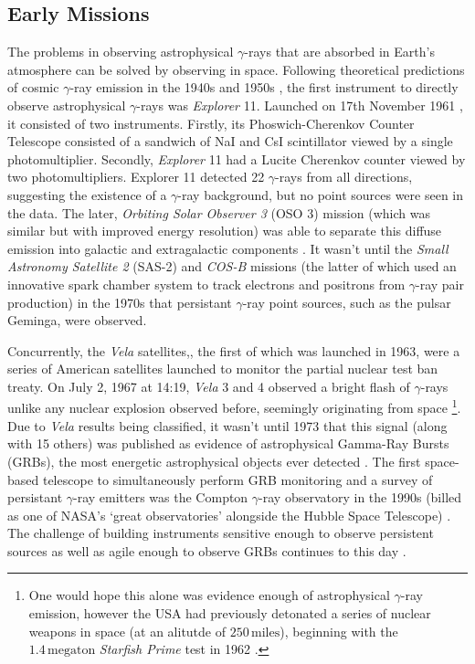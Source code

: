\subsection{Early Missions}
The problems in observing astrophysical $\gamma$-rays that are absorbed in Earth's atmosphere can be solved by observing in space. Following theoretical predictions of cosmic $\gamma$-ray emission in the 1940s and 1950s \cite{morrison}, the first instrument to directly observe astrophysical $\gamma$-rays was \textit{Explorer} 11. Launched on 17th November 1961 \cite{explorer}, it consisted of two instruments. Firstly, its Phoswich-Cherenkov Counter Telescope consisted of a sandwich of NaI and CsI scintillator viewed by a single photomultiplier. Secondly, \textit{Explorer} 11 had a  Lucite Cherenkov counter viewed by two photomultipliers. Explorer 11 detected 22 $\gamma$-rays from all directions, suggesting the existence of a $\gamma$-ray background, but no point sources were seen in the data. The later, \textit{Orbiting Solar Observer 3} (OSO 3) mission (which was similar but with improved energy resolution) was able to separate this diffuse emission into galactic and extragalactic components \cite{oso3}. It wasn't until the \textit{Small Astronomy Satellite 2} (SAS-2) \cite{sas2} and \textit{COS-B} \cite{cosb} missions (the latter of which used an innovative spark chamber system to track electrons and positrons from $\gamma$-ray pair production) in the 1970s that persistant $\gamma$-ray point sources, such as the pulsar Geminga, were observed.

Concurrently, the \textit{Vela} satellites,, the first of which was launched in 1963, were a series of American satellites launched to monitor the partial nuclear test ban treaty. On July 2, 1967 at 14:19, \textit{Vela} 3 and 4 observed a bright flash of $\gamma$-rays unlike any nuclear explosion observed before, seemingly originating from space \footnote{One would hope this alone was evidence enough of astrophysical $\gamma$-ray emission, however the USA had previously detonated a series of nuclear weapons in space (at an alitutde of $\mathrm{250\,miles}$), beginning with the $\mathrm{1.4\,megaton}$ \textit{Starfish Prime} test in 1962 \cite{starfish}.}. Due to \textit{Vela} results being classified, it wasn't until 1973 that this signal (along with 15 others) was published as evidence of astrophysical Gamma-Ray Bursts (GRBs), the most energetic astrophysical objects ever detected \cite{velagrb}. The first space-based telescope to simultaneously perform GRB monitoring and a survey of persistant $\gamma$-ray emitters was the Compton $\gamma$-ray observatory in the 1990s (billed as one of NASA's `great observatories' alongside the Hubble Space Telescope) \cite{compton}. The challenge of building instruments sensitive enough to observe persistent sources as well as agile enough to observe GRBs continues to this day \cite{magicGRB}.

